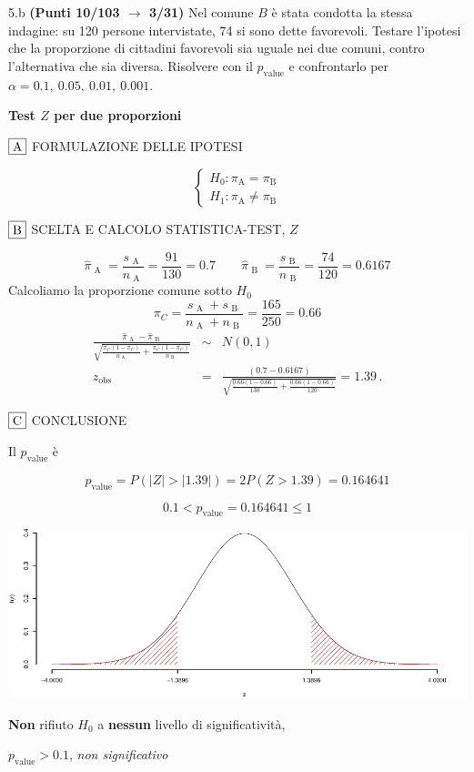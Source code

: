 \documentclass[
  11pt,
]{book}
\theoremstyle{mytheoremstyle}
\theoremstyle{mydefstyle}
\newenvironment{sol}
  {
  \begin{tcolorbox}[enhanced,breakable,arc=0.1mm,boxrule=1pt,colback=white,colframe=iblue,
  title=\bf \fontfamily{lmss}\selectfont \hspace{.5 cm} Soluzione,drop fuzzy shadow]

}{
\end{tcolorbox}
  }
\begin{document}
5.b \textbf{(Punti 10/103 \(\rightarrow\) 3/31)} Nel comune \(B\) è stata condotta la stessa indagine: su 120 persone intervistate, 74 si sono dette favorevoli. Testare l'ipotesi che la proporzione di cittadini favorevoli sia uguale nei due comuni, contro l'alternativa che sia diversa. Risolvere con il \(p_\text{value}\) e confrontarlo per \(\alpha = 0.1,\ 0.05,\ 0.01,\ 0.001\).

\begin{sol}
\textbf{Test \(Z\) per due proporzioni}

\(\fbox{A}\) FORMULAZIONE DELLE IPOTESI

\[\begin{cases}
   H_0: \pi_\text{A} = \pi_\text{B} \\
   H_1: \pi_\text{A} \neq \pi_\text{B} 
   \end{cases}\]

\(\fbox{B}\) SCELTA E CALCOLO STATISTICA-TEST, \(Z\)

\[\hat\pi_\text{ A }=\frac{s_\text{ A }}{n_\text{ A }}=\frac{ 91 }{ 130 }= 0.7 \qquad
   \hat\pi_\text{ B }=\frac{s_\text{ B }}{n_\text{ B }}=\frac{ 74 }{ 120 }= 0.6167 \]Calcoliamo la proporzione comune sotto \(H_0\)
\[
     \pi_C=\frac{s_\text{ A }+s_\text{ B }}{n_\text{ A }+n_\text{ B }}=
     \frac{ 165 }{ 250 }= 0.66 
   \]\begin{eqnarray*}
   \frac{\hat\pi_\text{ A } - \hat\pi_\text{ B }}
   {\sqrt{\frac {\pi_C(1-\pi_C)}{n_\text{ A }}+\frac {\pi_C(1-\pi_C)}{n_\text{ B }}}}&\sim&N(0,1)\\
   z_{\text{obs}}
   &=& \frac{ ( 0.7 -  0.6167 )} {\sqrt{\frac{ 0.66 (1- 0.66 )}{ 130 }+\frac{ 0.66 (1- 0.66 )}{ 120 }}}
   =   1.39 \, .
   \end{eqnarray*}

\(\fbox{C}\) CONCLUSIONE

Il \(p_{\text{value}}\) è

\[ p_{\text{value}} = P(|Z|>|1.39|)=2P(Z>1.39)=0.164641 \]

\[
 0.1 < p_\text{value}= 0.164641 \leq 1 
\]

\begin{center}\includegraphics{Esami_passati_con_soluzioni_files/figure-latex/unnamed-chunk-88-1} \end{center}

\textbf{Non} rifiuto \(H_0\) a \textbf{nessun}
livello di significatività,

\(p_\text{value}>0.1\),
\emph{non significativo}

\end{sol}
\end{document}
